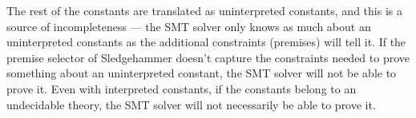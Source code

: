 \documentclass{article}
\begin{document}
		The rest of the constants are 
		translated as uninterpreted constants, 
		and this is a source of 
		incompleteness --- the SMT solver only 
		knows as much about an uninterpreted 
		constants as the additional constraints 
		(premises) will tell it. If the premise 
		selector of Sledgehammer doesn't capture 
		the constraints needed to prove something
		about an uninterpreted constant, the SMT 
		solver will not be able to prove it.
		Even with interpreted constants, if the 
		constants belong to an undecidable theory,
		the SMT solver will not necessarily be 
		able to prove it.
		


\end{document}
